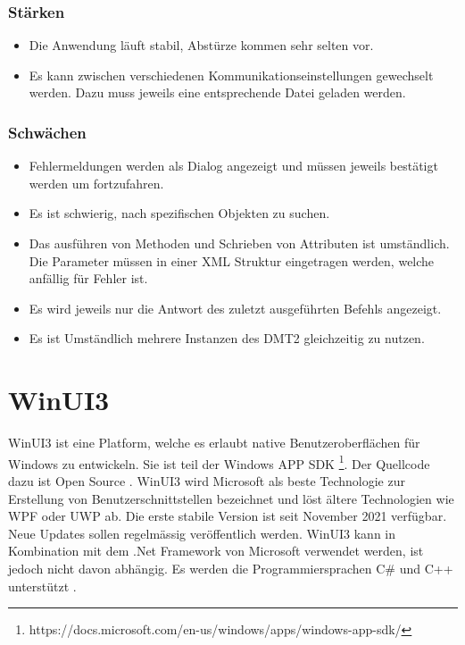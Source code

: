 \subsubsection{Stärken}
\begin{itemize}
   \item Die Anwendung läuft stabil, Abstürze kommen sehr selten vor.
   \item Es kann zwischen verschiedenen Kommunikationseinstellungen gewechselt werden. Dazu muss jeweils eine entsprechende Datei geladen werden.
\end{itemize}

\subsubsection{Schwächen}
\begin{itemize}
   \item Fehlermeldungen werden als Dialog angezeigt und müssen jeweils bestätigt werden um fortzufahren.
   \item Es ist schwierig, nach spezifischen Objekten zu suchen.
   \item Das ausführen von Methoden und Schrieben von Attributen ist umständlich. Die Parameter müssen in einer XML Struktur eingetragen werden, welche anfällig für Fehler ist.
   \item Es wird jeweils nur die Antwort des zuletzt ausgeführten Befehls angezeigt.
   \item Es ist Umständlich mehrere Instanzen des \ac{DMT2} gleichzeitig zu nutzen. 
\end{itemize}


\section{WinUI3}
WinUI3 ist eine Platform, welche es erlaubt native Benutzeroberflächen für Windows zu entwickeln.
Sie ist teil der Windows APP SDK \footnote{https://docs.microsoft.com/en-us/windows/apps/windows-app-sdk/}.
Der Quellcode dazu ist Open Source \parencite{winuiintro}.
WinUI3 wird Microsoft als beste Technologie zur Erstellung von Benutzerschnittstellen bezeichnet und löst ältere Technologien wie \ac{WPF} oder \ac{UWP} ab.
Die erste stabile Version ist seit November 2021 verfügbar.
Neue Updates sollen regelmässig veröffentlich werden.
WinUI3 kann in Kombination mit dem .Net Framework von Microsoft verwendet werden, ist jedoch nicht davon abhängig.
Es werden die Programmiersprachen C\# und C++ unterstützt \parencite{winuiroadmap}.



\pagebreak



